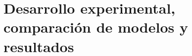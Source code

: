 \section*{Desarrollo experimental, comparación de modelos y resultados}
\label{sec:desarrollo_comp_results}

%
%

